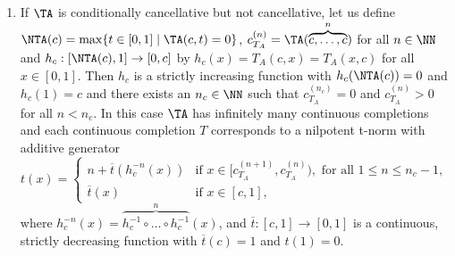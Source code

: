 \begin{itemize}
\begin{theorem}
\begin{enumerate}[label=(\roman*)]
			\item If $\TA$ is conditionally cancellative but not cancellative, let us define $\NTA(c)=\max\{t \in [0,1] \mid \TA(c,t)=0\}$, $c_{T_A}^{(n)}=\TA(\overbrace{c,\dots,c}^{n})$ for all $n \in \NN$ and $h_c : [\NTA(c),1] \to [0,c]$ by $h_c(x)=T_A(c,x)=T_A(x,c)$ for all $x \in [0,1]$. Then $h_c$ is a strictly increasing function with $h_c(\NTA(c))=0$ and $h_c(1)=c$ and  there exists an $n_c \in \NN$ such that $c_{T_A}^{(n_c)}=0$ and $c_{T_A}^{(n)}>0$ for all $n < n_c$. In this case $\TA$ has infinitely many continuous completions and each continuous completion $T$ corresponds to a nilpotent t-norm with additive generator
			\begin{equation}\label{eq:concan:completion-horizontalsection}
				t(x)=
				\left\{ \begin{array}{ll}
					n+\overline{t}(h_c^{-n}(x)) & \text{if } x \in [c_{T_A}^{(n+1)},c_{T_A}^{(n)}), \text{ for all } 1 \leq n \leq n_c-1, \\
					\overline{t}(x) & \text{if } x \in [c,1],
				\end{array} \right.
			\end{equation}
			where $h_c^{-n}(x) =\overbrace{h_c^{-1}\circ \dots \circ h_c^{-1}}^n(x)$, and $\overline{t}:[c,1] \to [0,1]$ is a continuous, strictly decreasing function with $\overline{t}(c)=1$ and $t(1)=0$.
		\end{enumerate}
	\end{theorem}
\end{itemize}

